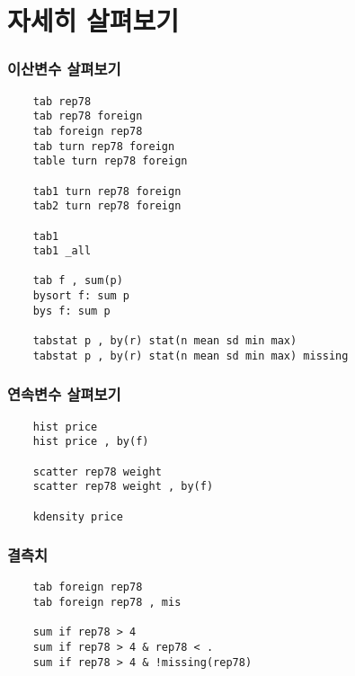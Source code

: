\documentclass[aspectratio=169,xcolor=dvipsnames,handout]{beamer}
\begin{document}
\section{자세히 살펴보기}
\begin{frame}
    \frametitle{이산변수 살펴보기}
    \begin{verbatim}
    tab rep78
    tab rep78 foreign
    tab foreign rep78
    tab turn rep78 foreign
    table turn rep78 foreign

    tab1 turn rep78 foreign
    tab2 turn rep78 foreign

    tab1
    tab1 _all

    tab f , sum(p)
    bysort f: sum p
    bys f: sum p

    tabstat p , by(r) stat(n mean sd min max)
    tabstat p , by(r) stat(n mean sd min max) missing
    \end{verbatim}
\end{frame}

\begin{frame}
    \frametitle{연속변수 살펴보기}
    \begin{verbatim}
    hist price
    hist price , by(f)

    scatter rep78 weight
    scatter rep78 weight , by(f)

    kdensity price
    \end{verbatim}
\end{frame}


\begin{frame}
    \frametitle{결측치}
    \begin{verbatim}
    tab foreign rep78
    tab foreign rep78 , mis

    sum if rep78 > 4
    sum if rep78 > 4 & rep78 < .
    sum if rep78 > 4 & !missing(rep78)
    \end{verbatim}
\end{frame}
\end{document}
